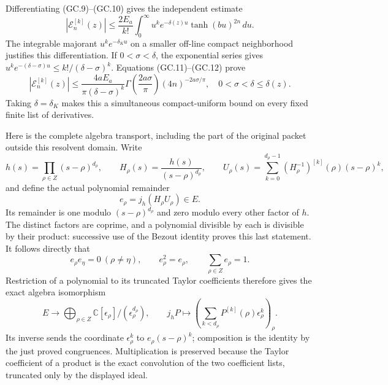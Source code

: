 Differentiating (GC.9)--(GC.10) gives the independent estimate
\[
 |\mathcal E_n^{[k]}(z)|\leq\frac{2E_a}{k!}
   \int_0^\infty u^k e^{-\delta(z)u}\tanh(bu)^{2n}\,du.  \tag{GC.15}
\]
The integrable majorant \(u^k e^{-\delta_Ku}\) on a smaller
off-line compact neighborhood justifies this differentiation.
If \(0<\sigma<\delta\), the exponential series gives
\(u^k e^{-(\delta-\sigma)u}\leq k!/(\delta-\sigma)^k\).
Equations (GC.11)--(GC.12) prove
\[
 \boxed{\displaystyle
 |\mathcal E_n^{[k]}(z)|\leq
 \frac{4aE_a}{\pi(\delta-\sigma)^k}
       \Gamma\!\left(\frac{2a\sigma}{\pi}\right)
                  (4n)^{-2a\sigma/\pi},
 \quad 0<\sigma<\delta\leq\delta(z).}                   \tag{GC.16}
\]
Taking \(\delta=\delta_K\) makes this a simultaneous compact-uniform
bound on every fixed finite list of derivatives.

Here is the complete algebra transport, including the part of the
original packet outside this resolvent domain.  Write
\[
 h(s)=\prod_{\rho\in Z}(s-\rho)^{d_\rho},\qquad
 H_\rho(s)=\frac{h(s)}{(s-\rho)^{d_\rho}},\qquad
 U_\rho(s)=\sum_{k=0}^{d_\rho-1}
          (H_\rho^{-1})^{[k]}(\rho)(s-\rho)^k,
\]
and define the actual polynomial remainder
\[
 e_\rho=j_h(H_\rho U_\rho)\in E.                        \tag{GC.17}
\]
Its remainder is one modulo \((s-\rho)^{d_\rho}\) and zero
modulo every other factor of \(h\).  The distinct factors are
coprime, and a polynomial divisible by each is divisible by their
product: successive use of the Bezout identity proves this last
statement.  It follows directly that
\[
 e_\rho e_\eta=0\ (\rho\ne\eta),\qquad
 e_\rho^2=e_\rho,\qquad \sum_{\rho\in Z}e_\rho=1.        \tag{GC.18}
\]
Restriction of a polynomial to its truncated Taylor coefficients
therefore gives the exact algebra isomorphism
\[
 E\longrightarrow\bigoplus_{\rho\in Z}
        \mathbb C[\epsilon_\rho]/(\epsilon_\rho^{d_\rho}),
 \qquad
 j_hP\longmapsto
    \left(\sum_{k<d_\rho}P^{[k]}(\rho)\epsilon_\rho^k\right)_\rho.
                                                        \tag{GC.19}
\]
Its inverse sends the coordinate \(\epsilon_\rho^k\) to
\(e_\rho(s-\rho)^k\); composition is the identity by the just
proved congruences.  Multiplication is preserved because the Taylor
coefficient of a product is the exact convolution of the two
coefficient lists, truncated only by the displayed ideal.

